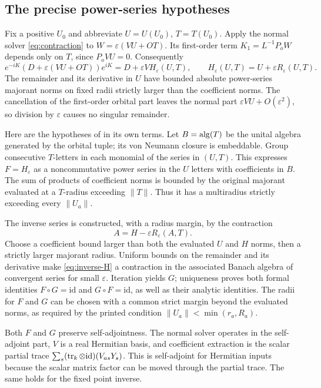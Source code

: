 \documentclass[11pt]{article}
\theoremstyle{definition}\newtheorem{definition}[theorem]{Definition}
\theoremstyle{remark}\newtheorem{remark}[theorem]{Remark}
\newcommand{\eps}{\varepsilon}\newcommand{\id}{\mathrm{id}}
\begin{document}
\subsection{The precise power-series hypotheses}
\label{sec:straighten}
Fix a positive $U_0$ and abbreviate $U=U(U_0)$, $T=T(U_0)$.
Apply the normal solver \eqref{eq:contraction} to
$W=\eps(VU+OT)$. Its first-order term $K_1=L^{-1}P_oW$ depends only
on $T$, since $P_oVU=0$. Consequently
\begin{equation}\label{eq:straighten}
 e^{-iK}(D+\eps(VU+OT))e^{iK}
 =D+\eps V H_\eps(U,T),\qquad
 H_\eps(U,T)=U+\eps R_\eps(U,T).
\end{equation}
The remainder and its derivative in $U$ have bounded absolute
power-series majorant norms on fixed radii strictly larger than the
coefficient norms. The cancellation of the first-order orbital part
leaves the normal part $\eps VU+O(\eps^2)$, so division by $\eps$
causes no singular remainder.

Here are the hypotheses of \cite[Theorem 4.1]{Shly} in its own terms.
Let $B=\operatorname{alg}(T)$ be the unital algebra generated by the orbital tuple;
its von Neumann closure is embeddable. Group consecutive $T$-letters
in each monomial of the series in $(U,T)$. This expresses
$F=H_\eps$ as a noncommutative power series in the $U$ letters with
coefficients in $B$. The sum of products of coefficient norms is
bounded by the original majorant evaluated at a $T$-radius exceeding
$\|T\|$. Thus it has a multiradius strictly exceeding every $\|U_a\|$.

The inverse series is constructed, with a radius margin, by the
contraction
\begin{equation}\label{eq:inverse-H}
 A=H-\eps R_\eps(A,T).
\end{equation}
Choose a coefficient bound larger than both the evaluated $U$ and $H$
norms, then a strictly larger majorant radius. Uniform bounds on the
remainder and its derivative make \eqref{eq:inverse-H} a contraction
in the associated Banach algebra of convergent series for small
$\eps$. Iteration yields $G$; uniqueness proves both formal identities
$F\circ G=\id$ and $G\circ F=\id$, as well as their analytic
identities. The radii for $F$ and $G$ can be chosen with a common
strict margin beyond the evaluated norms, as required by the printed
condition $\|U_a\|<\min(r_a,R_a)$.

Both $F$ and $G$ preserve self-adjointness. The normal solver operates
in the self-adjoint part, $V$ is a real Hermitian basis, and coefficient
extraction is the scalar partial trace
$\sum_s(\tr_k\otimes\id)(V_{as}Y_s)$. This is self-adjoint for
Hermitian inputs because the scalar matrix factor can be moved through
the partial trace. The same holds for the fixed point inverse.
\end{document}
